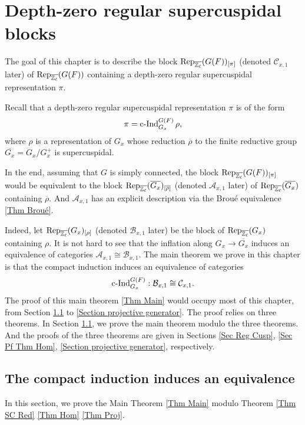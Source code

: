 
		
		\chapter{Depth-zero regular supercuspidal blocks} \label{Chapter Rep}
		
		The goal of this chapter is to describe the block $\operatorname{\operatorname{Rep}}_{\overline{\mathbb{Z}_{\ell}}}(G(F))_{[\pi]}$ (denoted $\mathcal{C}_{x,1}$ later) of $\operatorname{\operatorname{Rep}}_{\overline{\mathbb{Z}_{\ell}}}(G(F))$ containing a  depth-zero regular supercuspidal representation $\pi$.
		
		Recall that a depth-zero regular supercuspidal representation $\pi$ is of the form
		$$\pi=\operatorname{\operatorname{c-Ind}}_{G_x}^{G(F)}\rho,$$
		where $\rho$ is a representation of $G_x$ whose reduction $\overline{\rho}$ to the finite reductive group
		$\overline{G_x}=G_x/G_x^+$ is supercuspidal.
		
		In the end, assuming that $G$ is simply connected, the block $\operatorname{\operatorname{Rep}}_{\overline{\mathbb{Z}_{\ell}}}(G(F))_{[\pi]}$ would be equivalent to the block $\operatorname{\operatorname{Rep}}_{\overline{\mathbb{Z}_{\ell}}}(\overline{G_x})_{[\overline{\rho}]}$ (denoted $\mathcal{A}_{x,1}$ later) of $\operatorname{\operatorname{Rep}}_{\overline{\mathbb{Z}_{\ell}}}(\overline{G_x})$ containing $\overline{\rho}$. And $\mathcal{A}_{x,1}$ has an explicit description via the Broué equivalence \ref{Thm Broué}.
		
		Indeed, let $\operatorname{\operatorname{Rep}}_{\overline{\mathbb{Z}_{\ell}}}(G_x)_{[\rho]}$ (denoted $\mathcal{B}_{x,1}$ later) be the block of $\operatorname{\operatorname{Rep}}_{\overline{\mathbb{Z}_{\ell}}}(G_x)$ containing $\rho$. It is not hard to see that the inflation along $G_x \to \overline{G_x}$ induces an equivalence of categories 
		$\mathcal{A}_{x,1} \cong \mathcal{B}_{x,1}$. The main theorem we prove in this chapter is that the compact induction induces an equivalence of categories
		$$\operatorname{\operatorname{c-Ind}}_{G_x}^{G(F)}: \mathcal{B}_{x,1} \cong \mathcal{C}_{x,1}.$$
		The proof of this main theorem \ref{Thm Main} would occupy most of this chapter, from Section \ref{Section cInd} to \ref{Section projective generator}. The proof relies on three theorems. In Section \ref{Section cInd}, we prove the main theorem modulo the three theorems. And the proofs of the three theorems are given in Sections \ref{Sec Reg Cusp}, \ref{Sec Pf Thm Hom}, \ref{Section projective generator}, respectively.
		
		
		\section{The compact induction induces an equivalence}\label{Section cInd}
		In this section, we prove the Main Theorem \ref{Thm Main} modulo Theorem \ref{Thm SC Red} \ref{Thm Hom} \ref{Thm Proj}.
		
